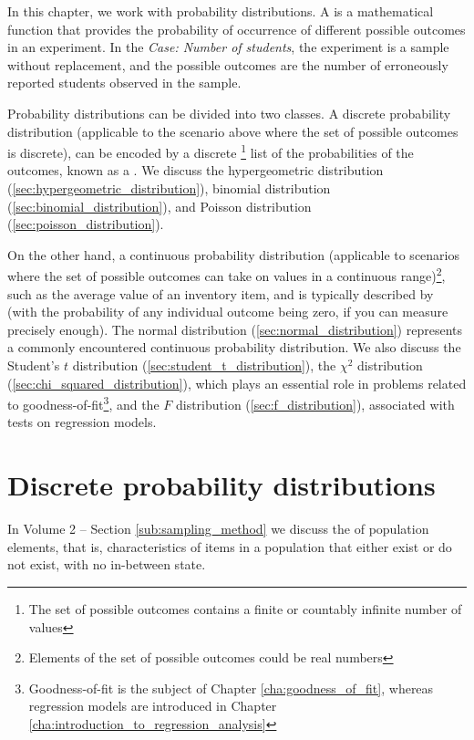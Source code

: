 \bigskip
In this chapter, we work with probability distributions. A  is a mathematical function that provides the probability of occurrence of different possible outcomes in an experiment. In the \emph{Case: Number of students}, the experiment is a sample without replacement, and the possible outcomes are the number of erroneously reported students observed in the sample.

Probability distributions can be divided into two classes. A discrete probability distribution (applicable to the scenario above where the set of possible outcomes is discrete), can be encoded by a discrete \footnote{The set of possible outcomes contains a finite or countably infinite number of values} list of the probabilities of the outcomes, known as a . We discuss the hypergeometric distribution (\ref{sec:hypergeometric_distribution}), binomial distribution (\ref{sec:binomial_distribution}), and Poisson distribution (\ref{sec:poisson_distribution}). 

On the other hand, a continuous probability distribution (applicable to scenarios where the set of possible outcomes can take on values in a continuous range)\footnote{Elements of the set of possible outcomes could be real numbers}, such as the average value of an inventory item, and is typically described by  (with the probability of any individual outcome being zero, if you can measure precisely enough). The normal distribution (\ref{sec:normal_distribution}) represents a commonly encountered continuous probability distribution. We also discuss the Student's $t$ distribution (\ref{sec:student_t_distribution}), the $\chi^2$ distribution (\ref{sec:chi_squared_distribution}), which plays an essential role in problems related to goodness-of-fit\footnote{Goodness-of-fit is the subject of Chapter \ref{cha:goodness_of_fit}, whereas regression models are introduced in Chapter \ref{cha:introduction_to_regression_analysis}}, and the $F$ distribution (\ref{sec:f_distribution}), associated with tests on regression models.

\section*{Discrete probability distributions}
In Volume 2 -- Section \ref{sub:sampling_method} we discuss the  
of population elements, that is, characteristics of items in a population that either exist or do not exist, 
with no in-between state.

